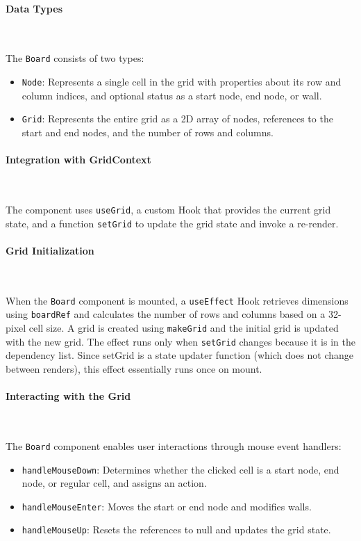 \paragraph{Data Types} \

The \texttt{Board} consists of two types:
\begin{itemize}
    \item \texttt{Node}: Represents a single cell in the grid with properties about its row and column indices, and optional status as a start node, end node, or wall.
    \item \texttt{Grid}: Represents the entire grid as a 2D array of nodes, references to the start and end nodes, and the number of rows and columns.
\end{itemize}

\paragraph{Integration with GridContext} \

The component uses \texttt{useGrid}, a custom Hook that provides the current grid state, and a function \texttt{setGrid} to update the grid state and invoke a re-render.

\paragraph{Grid Initialization} \

When the \texttt{Board} component is mounted, a \texttt{useEffect} Hook retrieves dimensions using \texttt{boardRef} and calculates the number of rows and columns based on a 32-pixel cell size. A grid is created using \texttt{makeGrid} and the initial grid is updated with the new grid. The effect runs only when \texttt{setGrid} changes because it is in the dependency list. Since setGrid is a state updater function (which does not change between renders), this effect essentially runs once on mount.

\paragraph{Interacting with the Grid} \

The \texttt{Board} component enables user interactions through mouse event handlers:

\begin{itemize}
    \item \texttt{handleMouseDown}: Determines whether the clicked cell is a start node, end node, or regular cell, and assigns an action.
    \item \texttt{handleMouseEnter}: Moves the start or end node and modifies walls.
    \item \texttt{handleMouseUp}: Resets the references to null and updates the grid state.
\end{itemize}

